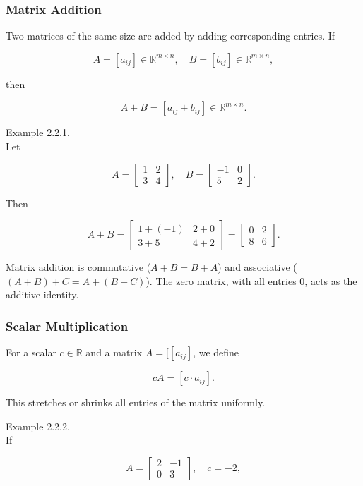 \documentclass[
  12pt,
  a4paper,
]{article}
\begin{document}
\subsubsection{Matrix Addition}\label{matrix-addition}

Two matrices of the same size are added by adding corresponding entries.
If

\[A = [a_{ij}] \in \mathbb{R}^{m \times n}, \quad
B = [b_{ij}] \in \mathbb{R}^{m \times n},\]

then

\[A + B = [a_{ij} + b_{ij}] \in \mathbb{R}^{m \times n}.\]

Example 2.2.1.\\
Let

\[A = \begin{bmatrix}
1 & 2 \\
3 & 4
\end{bmatrix}, \quad
B = \begin{bmatrix}
-1 & 0 \\
5 & 2
\end{bmatrix}.\]

Then

\[A + B = \begin{bmatrix}
1 + (-1) & 2 + 0 \\
3 + 5 & 4 + 2
\end{bmatrix}
=
\begin{bmatrix}
0 & 2 \\
8 & 6
\end{bmatrix}.\]

Matrix addition is commutative (\(A+B = B+A\)) and associative
(\((A+B)+C = A+(B+C)\)). The zero matrix, with all entries 0, acts as
the additive identity.

\subsubsection{Scalar Multiplication}\label{scalar-multiplication-2}

For a scalar \(c \in \mathbb{R}\) and a matrix \(A = [[a_{ij}]\), we
define

\[cA = [c \cdot a_{ij}].\]

This stretches or shrinks all entries of the matrix uniformly.

Example 2.2.2.\\
If

\[A = \begin{bmatrix}
2 & -1 \\
0 & 3
\end{bmatrix}, \quad c = -2,\]
\end{document}
